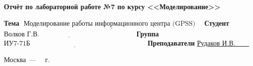 \begin{titlepage}
	
	\begin{center}
		\Large\textbf{Отчёт по лабораторной работе №7 по курсу <<Моделирование>>}
	\end{center}
	
	\noindent\newline\textbf{Тема} $\underline{\text{~Моделирование работы информационного центра (GPSS)~~~}}$\newline\newline
	\noindent\textbf{Студент} $\underline{\text{Волков Г.В.~~~~~~~~~~~~~~~~~~~~~~~~~~~~~~~~~~~~~~~~~~}}$\newline\newline
	\noindent\textbf{Группа} $\underline{\text{ИУ7-71Б~~~~~~~~~~~~~~~~~~~~~~~~~~~~~~~~~~~~~~~~~~~~~~~~~~~}}$\newline\newline
	\noindent\textbf{Преподаватели} \underline{Рудаков И.В.~~~~}\newline
	
	\begin{center}
		\vfill
		Москва~---~\the\year
		~г.
	\end{center}
 \restoregeometry
\end{titlepage}
